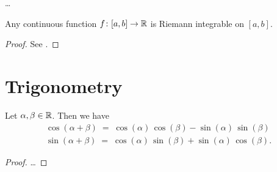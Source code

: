 \begin{definition}
  \label{def:riemann_integral}
  \ldots
\end{definition}

\begin{lemma}
  \label{lem:continuous_implies_riemann_integrable}
  Any continuous function $f \colon [a,b] \to \mathbb{R}$ is Riemann
  integrable on $[a,b]$.
\end{lemma}
\begin{proof}
  See \MetSpCourse{}.
\end{proof}



\section{Trigonometry}

\begin{lemma}
  \label{lem:trigonometric_angle_sum}
  Let $\alpha, \beta \in \mathbb{R}$. Then we have
  \begin{align*}
    \cos (\alpha + \beta) \; = \; \cos (\alpha) \, \cos (\beta) - \sin (\alpha) \, \sin (\beta) \\
    \sin (\alpha + \beta) \; = \; \cos (\alpha) \, \sin (\beta) + \sin (\alpha) \, \cos (\beta) .
  \end{align*}
\end{lemma}
\begin{proof}
  \ldots
\end{proof}
